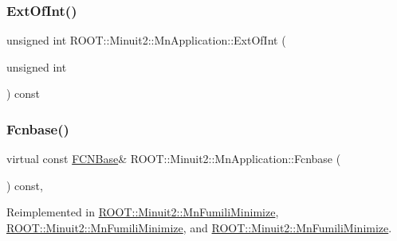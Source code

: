 \mbox{\label{classROOT_1_1Minuit2_1_1MnApplication_a61dc63d2a6320aae96867ad57918c496}} 
\subsubsection{\texorpdfstring{ExtOfInt()}{ExtOfInt()}\hspace{0.1cm}{\footnotesize\ttfamily [3/3]}}
{\footnotesize\ttfamily unsigned int R\+O\+O\+T\+::\+Minuit2\+::\+Mn\+Application\+::\+Ext\+Of\+Int (\begin{DoxyParamCaption}\item[{unsigned int}]{ }\end{DoxyParamCaption}) const}

\mbox{\label{classROOT_1_1Minuit2_1_1MnApplication_af4eb3fe4927d3a8e0efcd5c6b7100881}} 
\subsubsection{\texorpdfstring{Fcnbase()}{Fcnbase()}\hspace{0.1cm}{\footnotesize\ttfamily [1/3]}}
{\footnotesize\ttfamily virtual const \mbox{\hyperlink{classROOT_1_1Minuit2_1_1FCNBase}{F\+C\+N\+Base}}\& R\+O\+O\+T\+::\+Minuit2\+::\+Mn\+Application\+::\+Fcnbase (\begin{DoxyParamCaption}{ }\end{DoxyParamCaption}) const\hspace{0.3cm}{\ttfamily [inline]}, {\ttfamily [virtual]}}



Reimplemented in \mbox{\hyperlink{classROOT_1_1Minuit2_1_1MnFumiliMinimize_a4540fd0311c15810965864988d4c70d1}{R\+O\+O\+T\+::\+Minuit2\+::\+Mn\+Fumili\+Minimize}}, \mbox{\hyperlink{classROOT_1_1Minuit2_1_1MnFumiliMinimize_a4540fd0311c15810965864988d4c70d1}{R\+O\+O\+T\+::\+Minuit2\+::\+Mn\+Fumili\+Minimize}}, and \mbox{\hyperlink{classROOT_1_1Minuit2_1_1MnFumiliMinimize_a4540fd0311c15810965864988d4c70d1}{R\+O\+O\+T\+::\+Minuit2\+::\+Mn\+Fumili\+Minimize}}.

